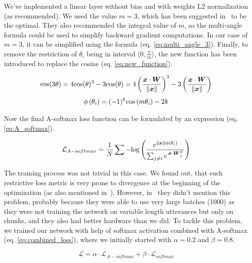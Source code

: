 \medskip
We've implemented a linear layer without 	bias and with weights L2 normalization (as recommended). We used the value $ m = 3 $, which has been suggested in~\cite{A_softmax} to be the optimal. They also recommended the integral value of $ m $, so the multi-angle formula could be used to simplify backward gradient computations. In our case of $ m = 3 $, it can be simplified using the formula (eq. \ref{eq:multi_angle_3}). Finally, to remove the restriction of $ \theta_i $ being in interval $ \langle 0, \frac{\pi}{m} \rangle $, the new function has been introduced to replace the cosine (eq. \ref{eq:new_function}).

\begin{equation} \label{eq:multi_angle_3}
\textnormal{cos}(3\theta) = 
4\textnormal{cos}(\theta)^3 - 3\textnormal{cos}(\theta) = 
4 \left( \frac{\boldsymbol{x} \cdot \boldsymbol{W}}{\lVert\boldsymbol{x}\rVert} \right) ^3 - 
3 \left( \frac{\boldsymbol{x} \cdot \boldsymbol{W}}{\lVert\boldsymbol{x}\rVert} \right)
\end{equation}
\begin{equation} \label{eq:new_function}
\phi \left( \theta_i \right) = 
(-1)^k \textnormal{cos} \left( m \theta_i \right) - 2k
\end{equation}

\medskip
\noindent
Now the final A-softmax loss function can be formulated by an expression (eq. \ref{eq:A_softmax}).

\begin{equation} \label{eq:A_softmax}
\mathcal{L}_{A-softmax} = \frac{1}{N} \sum - \textnormal{log} \left( 
\frac{e^{\lVert\boldsymbol{x}\rVert \phi(\theta_i)}}
{\sum_{j \neq i} e^{\,\boldsymbol{x} \cdot \boldsymbol{W}_j^T}}
\right)
\end{equation}

\medskip
\noindent
The training process was not trivial in this case. We found out, that such restrictive loss metric is very prone to divergence at the beginning of the optimization (as also mentioned in~\cite{arc_face}). However, in~\cite{A_softmax} they didn't mention this problem, probably because they were able to use very large batches (1000) as they were not training the network on variable length utterances but only on chunks, and they also had better hardware than we did. To tackle this problem, we trained our network with help of softmax activation combined with A-softmax (eq. \ref{eq:combined_loss}), where we initially started with $ \alpha = 0.2 $ and $ \beta = 0.8 $.

\begin{equation} \label{eq:combined_loss}
\mathcal{L} = \alpha \cdot \mathcal{L}_{A-softmax} + \beta \cdot \mathcal{L}_{softmax}
\end{equation}

